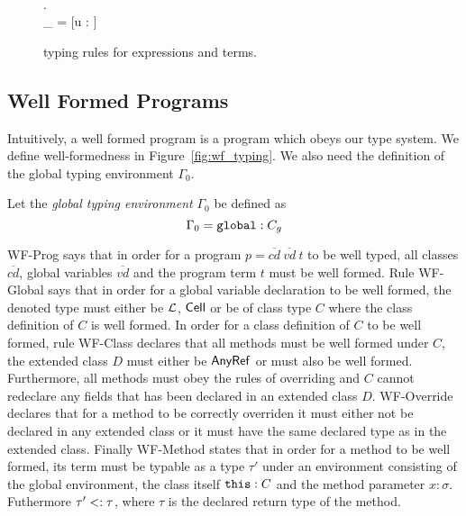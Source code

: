 \begin{figure}[h!]
    \vspace{0.5em}

    { \andalso {} \\
    \forall {} \in {}. \; \\
    \Gamma_{} = [u \mapsto \CellType :  \in {}]\\
    }
    {  }

  \caption{\RACL{} typing rules for expressions and terms.}
  \label{fig:expr_typing}
\end{figure}

\subsection{Well Formed Programs}%
\label{sub:well_formed_programs}

Intuitively, a well formed program is a program which obeys our type system. We
define well-formedness in Figure~\ref{fig:wf_typing}. We also need the
definition of the global typing environment $\Gamma_0$. 
\begin{definition}
  Let the \emph{global typing environment} $\Gamma_0$ be defined as 
  \begin{equation*}
    \Gamma_0 = \mbox{\mdseries\texttt{global}} : C_g
  \end{equation*}
\end{definition}
{\sc WF-Prog} says that in order for a program $p =
\overline{cd}~\overline{vd}~t$ to be well typed, all classes $\overline{cd}$,
global variables $\overline{vd}$ and the program term $t$ must be well formed.
Rule {\sc WF-Global} says that in order for a global variable declaration to be
well formed, the denoted type must either be $\mbox{$\mathcal{L}$}$, $\mbox{$\mathsf{Cell}$}$ or be of
class type $C$ where the class definition of $C$ is well formed. In order for a
class definition of $C$ to be well formed, rule {\sc WF-Class} declares that all
methods must be well formed under $C$, the extended class $D$ must either be
$\mbox{$\mathsf{AnyRef}$}$ or must also be well formed. Furthermore, all methods must obey the
rules of overriding and $C$ cannot redeclare any fields that has been declared
in an extended class $D$. {\sc WF-Override} declares that for a method to be
correctly overriden it must either not be declared in any extended class or it
must have the same declared type as in the extended class. Finally {\sc
WF-Method} states that in order for a method to be well formed, its term must be
typable as a type $\tau'$ under an environment consisting of the global
environment, the class itself $\mbox{\mdseries\texttt{this}} : C$ and the method parameter $x: \sigma$.
Futhermore $\tau' <: \tau$, where $\tau$ is the declared return type of the
method.




